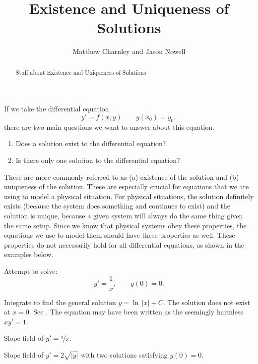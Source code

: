 \documentclass{ximera}
\title{Existence and Uniqueness of Solutions}
\author{Matthew Charnley and Jason Nowell}
\begin{document}
\begin{abstract}
    Stuff about Existence and Uniqueness of Solutions
\end{abstract}
\maketitle

\label{existunique:section}


If we take the differential equation
\[ 
    y' = f(x,y) \qquad y(x_0) = y_0, 
\] 
there are two main questions we want to answer about this equation.

\begin{enumerate}%
    \item Does a solution exist to the differential equation?
    \item Is there only one solution to the differential equation?
\end{enumerate}

These are more commonly referred to as (a) existence of the solution and (b) uniqueness of the solution. These are especially crucial for equations that we are using to model a physical situation. For physical situations, the solution definitely exists (because the system does something and continues to exist) and the solution is unique, because a given system will always do the same thing given the same setup. Since we know that physical systems obey these properties, the equations we use to model them should have these properties as well. These properties do not necessarily hold for all differential equations, as shown in the examples below. 

\begin{example}
    Attempt to solve:
    \begin{equation*}
        y' = \frac{1}{x}, \qquad y(0) = 0 .
    \end{equation*}
    
    Integrate to find the general solution $y = \ln \, \lvert x \rvert + C$.  The solution does not exist at $x=0$.  See . The equation may have been written as the seemingly harmless $x y' = 1$.
    
    \begin{myfig}
        \parbox[t]{3in}{
         \capstart
         \caption{Slope field of $y' = \nicefrac{1}{x}$.\label{1.3:xinvfig}}
        }
        \quad
        \parbox[t]{3in}{
         \capstart
         \caption{Slope field of $y' = 2 \sqrt{\lvert y \rvert}$ with two solutions satisfying $y(0) = 0$.\label{1.3:sqrtfig}}
        }
    \end{myfig}
\end{example}
\end{document}
